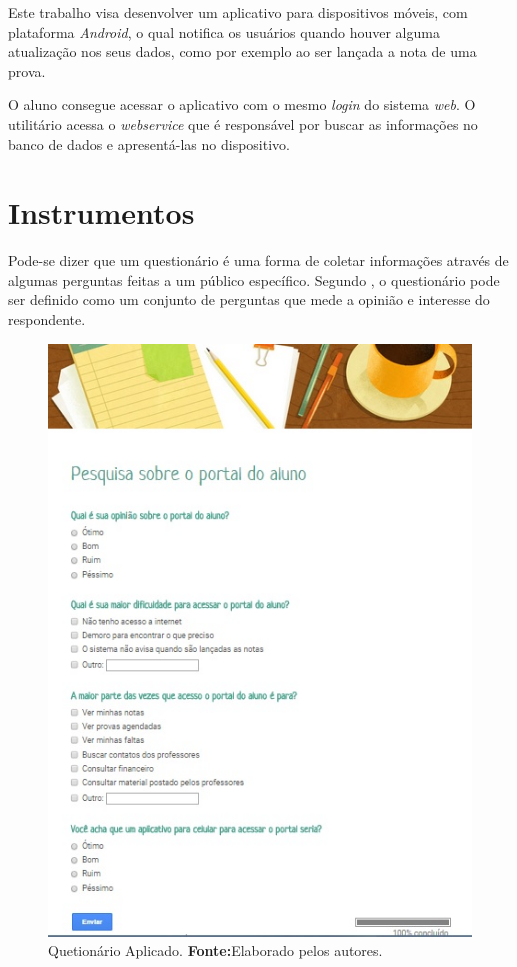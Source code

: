 	\par Este trabalho visa desenvolver um aplicativo para dispositivos móveis, 
com plataforma \textit{Android}, o qual notifica os usuários quando houver alguma
atualização nos seus dados, como por exemplo ao ser lançada a nota de uma prova.
	
	\par O aluno consegue acessar o aplicativo com o mesmo \textit{login} do
sistema \textit{web}. O utilitário acessa o \textit{webservice} que é
responsável por buscar as informações no banco de dados e apresentá-las no
dispositivo.
	
\section{Instrumentos}

	\par Pode-se dizer que um questionário é uma forma de coletar informações
através de algumas perguntas feitas a um público específico. Segundo
, o questionário pode ser definido como um conjunto
de perguntas que mede a opinião e interesse do respondente.
\begin{figure}[h!]
	\centerline{\includegraphics[scale=0.5]{./imagens/2_q_metodologico/qm1.png}}
	\caption[Quetionário Aplicado]{Quetionário Aplicado.
		\textbf{Fonte:}Elaborado pelos autores.}
	\label{fig:qm1}
\end{figure}
	
